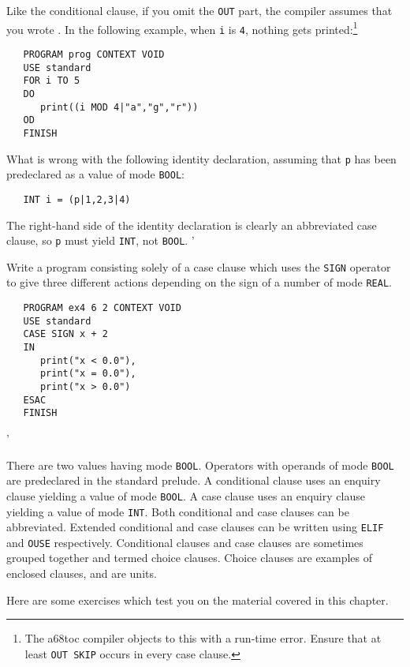 Like the conditional clause, if you omit the \verb|OUT| part, the
compiler assumes that you wrote .  In the
following example, when \verb|i| is \verb|4|, nothing gets
printed:\footnote{The a68toc compiler objects to this with a run-time
error.  Ensure that at least \protect\texttt{OUT SKIP} occurs in
every case clause.}
\begin{verbatim}
   PROGRAM prog CONTEXT VOID
   USE standard
   FOR i TO 5
   DO
      print((i MOD 4|"a","g","r"))
   OD
   FINISH
\end{verbatim}

\begin{exercise}
\item What is wrong with the following identity declaration, assuming
that \verb|p| has been predeclared as a value of mode \verb|BOOL|:
\begin{verbatim}
   INT i = (p|1,2,3|4)
\end{verbatim}
\indent\ans The right-hand side of the identity declaration is
clearly an abbreviated case clause, so \verb|p| must yield
\verb|INT|, not \verb|BOOL|.
'
\item Write a program consisting solely of a case clause which uses
the \verb|SIGN| operator to give three different actions depending on
the sign of a number of mode \verb|REAL|. \ans \ %
\begin{verbatim}
   PROGRAM ex4 6 2 CONTEXT VOID
   USE standard
   CASE SIGN x + 2
   IN
      print("x < 0.0"),
      print("x = 0.0"),
      print("x > 0.0")
   ESAC
   FINISH
\end{verbatim}
'
\end{exercise}

There are two values having mode \verb|BOOL|. Operators with operands
of mode \verb|BOOL| are predeclared in the standard prelude.  A
conditional clause uses an enquiry clause yielding a value of mode
\verb|BOOL|.  A case clause uses an enquiry clause yielding a value
of mode \verb|INT|.  Both conditional and case clauses can be
abbreviated.  Extended conditional and case clauses can be written
using \verb|ELIF| and \verb|OUSE| respectively.  Conditional clauses
and case clauses are sometimes grouped together and termed choice
clauses. Choice clauses are examples of enclosed clauses, and are
units.

Here are some exercises which test you on the material covered in this
chapter.

